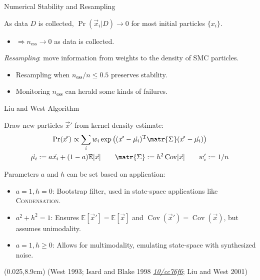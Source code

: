 \documentclass[xcolor=dvipsnames, compress]{beamer}
\renewcommand\UrlFont{\color{red}\rmfamily\itshape}
\newcommand{\shortdoi}[1]{\href{http://doi.org/#1}{\UrlFont 10/#1}}
\newcommand{\T}{\mathrm{T}}
\newcommand{\Cov}{\operatorname{Cov}}
\newcommand{\expect}{\mathbb{E}}
\newcommand{\defeq}{\mathrel{:=}}
\newcommand{\bottomnote}[1]{
  \begin{textblock*}{0.95\paperwidth} (0.025\paperwidth,8.9cm)
    {\tiny \hfill #1}
  \end{textblock*}
}
\begin{document}
\begin{frame}{Numerical Stability and Resampling}

  As data $D$ is collected, $\Pr(\vec{x}_i | D) \to 0$ for most
  initial particles $\{x_i\}$.

  \begin{itemize}
    \item $\Rightarrow n_{\text{ess}} \to 0$ as data is collected.
  \end{itemize}

  \emph{Resampling}: move information from weights
  to the density of SMC particles.

  \begin{itemize}
    \item Resampling when $n_{\text{ess}} / n \le 0.5$ preserves stability.
    \item Monitoring $n_{\text{ess}}$ can herald some kinds of failures.
  \end{itemize}

\end{frame}
 
\begin{frame}{Liu and West Algorithm}
  
  Draw new particles $\vec{x}'$ from kernel density estimate:
  \begin{gather*}
    \Pr(\vec{x}') \propto \sum_i w_i \exp\left((\vec{x}' - \vec{\mu}_i)^\T\matr{\Sigma}(\vec{x}' - \vec{\mu}_i)\right) \\
    \vec{\mu}_i \defeq a \vec{x}_i + (1 - a) \mathbb{E}[\vec{x}] \qquad
    \matr{\Sigma} \defeq h^2 \Cov[\vec{x}] \qquad
    w_i' \defeq 1 / n
  \end{gather*}

  \pause

  Parameters $a$ and $h$ can be set based on application:
  \begin{itemize}
    \item $a = 1, h = 0$: Bootstrap filter, used in state-space applications
      like \textsc{Condensation}.
    \item $a^2 + h^2 = 1$: Ensures $\expect[\vec{x}'] = \expect[\vec{x}]$
      and $\Cov(\vec{x}') = \Cov(\vec{x})$, but assumes unimodality.
    \item $a = 1, h \ge 0$: Allows for multimodality, emulating state-space
      with synthesized noise.
  \end{itemize}
  
  \bottomnote{(West 1993;  Isard and Blake 1998 \shortdoi{cc76f6}; Liu and West 2001)}
  
\end{frame}
\end{document}

